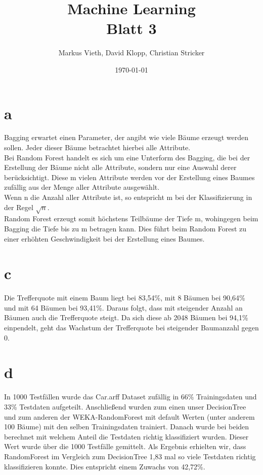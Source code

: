 \documentclass[a4paper,11pt,twoside]{article}
\title{Machine Learning\\ Blatt 3}
\author{Markus Vieth, David Klopp, Christian Stricker}
\date{\today}
\begin{document}
\newcommand{\cor}[1]{\textcolor{red}{\textit{#1}}}
\maketitle
\cleardoublepage
\pagestyle{myheadings}

\section*{a}
Bagging erwartet einen Parameter, der angibt wie viele Bäume erzeugt werden sollen. Jeder dieser Bäume betrachtet hierbei alle Attribute. \\
Bei Random Forest handelt es sich um eine Unterform des Bagging, die bei der Erstellung der Bäume nicht alle Attribute, sondern nur eine Auswahl derer berücksichtigt. Diese m vielen Attribute werden vor der Erstellung eines Baumes zufällig aus der Menge aller Attribute ausgewählt. \\Wenn n die Anzahl aller Attribute ist, so entspricht m bei der Klassifizierung in der Regel $\sqrt n$.\\
Random Forest erzeugt somit höchstens Teilbäume der Tiefe m, wohingegen beim Bagging die Tiefe bis zu m betragen kann. 
Dies führt beim Random Forest zu einer erhöhten Geschwindigkeit bei der Erstellung eines Baumes.
\section*{c}
Die Trefferquote mit einem Baum liegt bei 83,54\%, mit 8 Bäumen bei 90,64\% und mit 64 Bäumen bei 93,41\%. Daraus folgt, dass mit steigender Anzahl an Bäumen auch die Trefferquote steigt. Da sich diese ab 2048 Bäumen bei 94,1\% einpendelt, geht das Wachstum der Trefferquote bei steigender Baumanzahl gegen 0.
\section*{d}
In 1000 Testfällen wurde das Car.arff Dataset zufällig in 66\% Trainingsdaten und 33\% Testdaten aufgeteilt. Anschließend wurden zum einen unser DecisionTree und zum anderen der WEKA-RandomForest mit default Werten (unter anderem 100 Bäume) mit den selben Trainingsdaten trainiert. Danach wurde bei beiden berechnet mit welchem Anteil die Testdaten richtig klassifiziert wurden. Dieser Wert wurde über die 1000 Testfälle gemittelt. Als Ergebnis erhielten wir, dass RandomForest im Vergleich zum DecisionTree 1,83 mal so viele Testdaten richtig klassifizieren konnte. Dies entspricht einem Zuwachs von 42,72\%.
\end{document}
